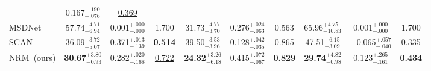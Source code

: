 \begin{table}[t]
{\begin{tabular}{@{} l ccc ccc ccc @{}}
      & 0.167$^{+.190}_{-.076}$
      & \underline{0.369} \\
    MSDNet~\citep{huang2017multiscale}
      & 57.74$^{+4.71}_{-6.94}$
      & 0.001$^{+.000}_{-.000}$
      & 1.700
      & 31.73$^{+4.77}_{-3.70}$
      & 0.276$^{+.024}_{-.063}$
      & 0.563
      & 65.96$^{+4.75}_{-10.83}$
      & 0.001$^{+.000}_{-.000}$
      & 1.700 \\
    SCAN~\citep{zhang2019scan}
      & 36.09$^{+3.72}_{-5.07}$
      & \underline{0.371}$^{+.013}_{-.139}$
      & \textbf{0.514}
      & 39.50$^{+3.53}_{-3.96}$
      & 0.128$^{+.042}_{-.035}$
      & \underline{0.865}
      & 47.51$^{+6.15}_{-3.09}$
      & $-$0.065$^{+.057}_{-.040}$
      & 0.335 \\
    \midrule
    NRM~(ours)
      & \textbf{30.67}$^{+3.80}_{-0.93}$
      & 0.282$^{+.020}_{-.168}$
      & \underline{0.722}
      & \textbf{24.32}$^{+3.26}_{-6.18}$
      & 0.415$^{+.072}_{-.067}$
      & \textbf{0.829}
      & \textbf{29.74}$^{+4.82}_{-0.98}$
      & 0.123$^{+.265}_{-.161}$
      & \textbf{0.434} \\
    \bottomrule
  \end{tabular}
  }
\end{table}
